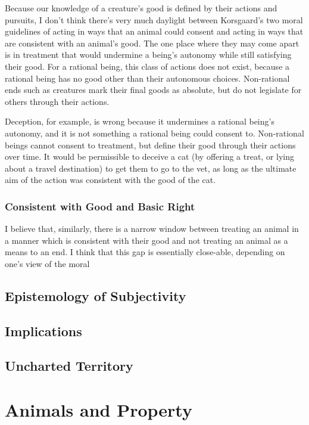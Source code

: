 \documentclass[12pt]{article}
\begin{document}
			Because our knowledge of a creature’s good is defined by their
			actions and pursuits, I don’t think there’s very much daylight
			between Korsgaard’s two moral guidelines of acting in ways that an
			animal could consent and acting in ways that are consistent with an
			animal’s good.  The one place where they may come apart is in
			treatment that would undermine a being’s autonomy while still
			satisfying their good.  For a rational being, this class of actions
			does not exist, because a rational being has no good other than
			their autonomous choices.  Non-rational ends such as creatures mark
			their final goods as absolute, but do not legislate for others
			through their actions.

			Deception, for example, is wrong because it undermines a rational
			being’s autonomy, and it is not something a rational being could
			consent to. Non-rational beings cannot consent to treatment, but
			define their good through their actions over time. It would be
			permissible to deceive a cat (by offering a treat, or lying about a
			travel destination) to get them to go to the vet, as long as the
			ultimate aim of the action was consistent with the good of the cat.

		\subsubsection{Consistent with Good and Basic Right}
			
			I believe that, similarly, there is a narrow window between
			treating an animal in a manner which is consistent with their good
			and not treating an animal as a means to an end.  I think that this
			gap is essentially close-able, depending on one’s view of the moral

	\subsection{Epistemology of Subjectivity}
	\subsection{Implications}
	\subsection{Uncharted Territory}

\section{Animals and Property}
\end{document}
